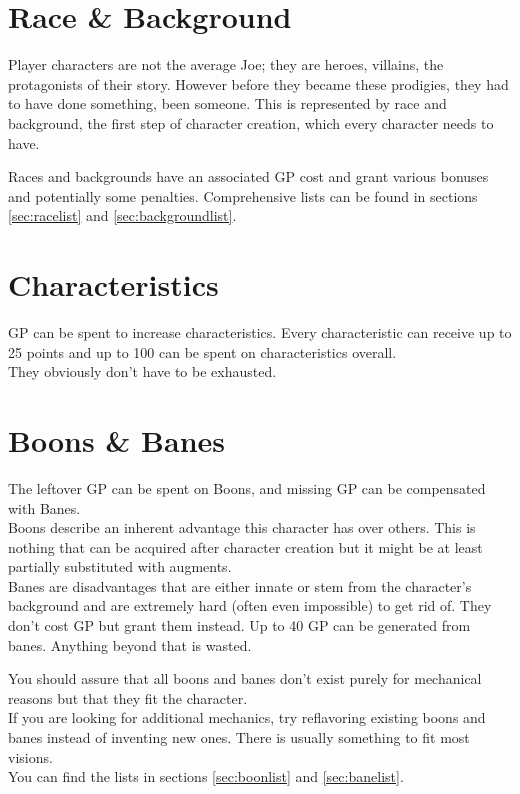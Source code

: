 \documentclass[12pt,a4paper,openany,usenames,dvipsnames]{book}
\begin{document}
	\begin{multicols}{2}
	\begin{enumerate}
	\end{enumerate}
	\end{multicols}

	\section{Race \& Background}
	Player characters are not the average Joe; they are heroes, villains, the protagonists of their story. However before they became these prodigies, they had to have done something, been someone. This is represented by race and background, the first step of character creation, which every character needs to have.\par
	Races and backgrounds have an associated GP cost and grant various bonuses and potentially some penalties. Comprehensive lists can be found in sections \ref{sec:racelist} and \ref{sec:backgroundlist}.
	\section{Characteristics}
	GP can be spent to increase characteristics. Every characteristic can receive up to 25 points and up to 100 can be spent on characteristics overall.\\
	They obviously don’t have to be exhausted.
	\section{Boons \& Banes}
	The leftover GP can be spent on Boons, and missing GP can be compensated with Banes.\\
	Boons describe an inherent advantage this character has over others. This is nothing that can be acquired after character creation but it might be at least partially substituted with augments.\\
	Banes are disadvantages that are either innate or stem from the character’s background and are extremely hard (often even impossible) to get rid of.
	They don’t cost GP but grant them instead.
	Up to 40 GP can be generated from banes.
	Anything beyond that is wasted.
	\par
	You should assure that all boons and banes don’t exist purely for mechanical reasons but that they fit the character.\\
	If you are looking for additional mechanics, try reflavoring existing boons and banes instead of inventing new ones. There is usually something to fit most visions.\\
	You can find the lists in sections \ref{sec:boonlist} and \ref{sec:banelist}.
\end{document}
